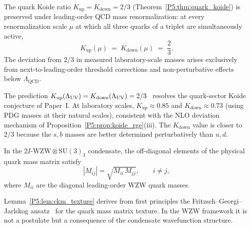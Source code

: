 \begin{proposition}
\label{P5:prop:koide_rge}
The quark Koide ratio $K_{\mathrm{up}}=K_{\mathrm{down}}=2/3$
(Theorem~\ref{P5:thm:quark_koide}) is preserved under leading-order
QCD mass renormalization: at every renormalization scale $\mu$ at
which all three quarks of a triplet are simultaneously active,
\begin{equation}
  K_{\mathrm{up}}(\mu) \;=\; K_{\mathrm{down}}(\mu) \;=\; \frac{2}{3}.
  \label{P5:eq:koide_rge_inv}
\end{equation}
The deviation from $2/3$ in measured laboratory-scale masses arises
exclusively from next-to-leading-order threshold corrections
and non-perturbative effects below $\Lambda_{\mathrm{QCD}}$.
\end{proposition}

\begin{remark}
\label{P5:rem:quark_koide_obs}
The prediction $K_{\mathrm{up}}(\Lambda_{\mathrm{UV}})=K_{\mathrm{down}}(\Lambda_{\mathrm{UV}})=2/3$~\cite{Koide1983}
resolves the quark-sector Koide conjecture of Paper~I. At laboratory
scales, $K_{\mathrm{up}}\approx0.85$ and $K_{\mathrm{down}}\approx0.73$
(using PDG masses at their natural scales), consistent with the NLO
deviation mechanism of Proposition~\ref{P5:prop:koide_rge}(iii). The
$K_{\mathrm{down}}$ value is closer to $2/3$ because the $s,b$ masses
are better determined perturbatively than $u,d$.
\end{remark}

\begin{lemma}
\label{P5:lem:ckm_texture}
In the $2I\text{-WZW}\otimes\mathrm{SU}(3)_3$ condensate, the off-diagonal
elements of the physical quark mass matrix satisfy
\begin{equation}
  |M_{ij}| = \sqrt{M_{ii}\,M_{jj}}, \qquad i\neq j,
  \label{P5:eq:texture}
\end{equation}
where $M_{ii}$ are the diagonal leading-order WZW quark masses.
\end{lemma}

\begin{remark}
\label{P5:rem:fgj_ansatz}
Lemma~\ref{P5:lem:ckm_texture} derives from first principles the
Fritzsch--Georgi--Jarlskog ansatz~\cite{Fritzsch1978,GJ1979} for the quark
mass matrix texture.  In the WZW framework it is not a postulate but a
consequence of the condensate wavefunction structure.
\end{remark}

